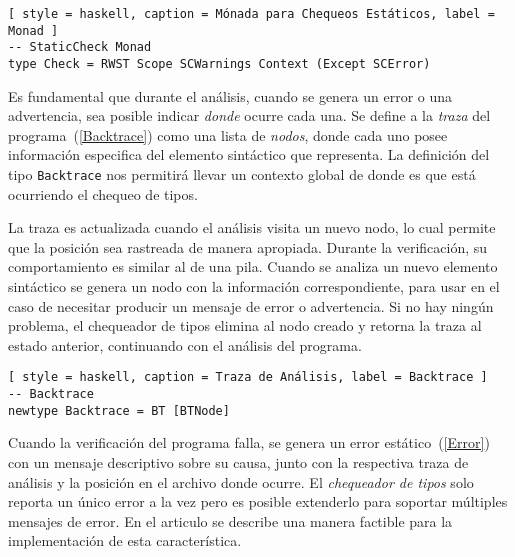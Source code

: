 \begin{lstlisting}[ style = haskell, caption = Mónada para Chequeos Estáticos, label = Monad ]
-- StaticCheck Monad
type Check = RWST Scope SCWarnings Context (Except SCError)
\end{lstlisting}


Es fundamental que durante el análisis, cuando se genera un error o una advertencia, sea posible indicar \textit{donde} ocurre cada una.
Se define a la \textit{traza} del programa~(\ref{Backtrace}) como una lista de \textit{nodos}, donde cada uno posee información especifica del elemento sintáctico que representa.
La definición del tipo \lstinline[style = haskell]{Backtrace} nos permitirá
llevar un contexto global de donde es que está ocurriendo el chequeo de tipos.

La traza es actualizada cuando el análisis visita un nuevo nodo, lo cual permite que la posición sea rastreada de manera apropiada.
Durante la verificación, su comportamiento es similar al de una pila.
Cuando se analiza un nuevo elemento sintáctico se genera un nodo con la información correspondiente, para usar en el caso de necesitar producir un mensaje de error o advertencia.
Si no hay ningún problema, el chequeador de tipos elimina al nodo creado y retorna la traza al estado anterior, continuando con el análisis del programa.

\begin{lstlisting}[ style = haskell, caption = Traza de Análisis, label = Backtrace ]
-- Backtrace
newtype Backtrace = BT [BTNode]
\end{lstlisting}


Cuando la verificación del programa falla, se genera un error estático~(\ref{Error}) con un mensaje descriptivo sobre su causa, junto con la respectiva traza de análisis y la posición en el archivo donde ocurre.
El \textit{chequeador de tipos} solo reporta un único error a la vez pero es posible extenderlo para soportar múltiples mensajes de error.
En el articulo se describe una manera factible para la implementación de esta característica.

